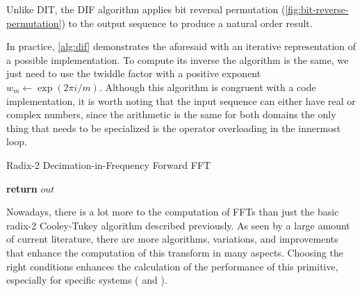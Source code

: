 \documentclass[
  oneside,
  11pt, a4paper,
  footinclude=true,
  headinclude=true,
  cleardoublepage=empty
]{scrbook}
\begin{document}

Unlike DIT, the DIF algorithm applies bit reversal permutation (\autoref{fig:bit-reverse-permutation}) to the output sequence to produce a natural order result.

In practice, \autoref{alg:dif} demonstrates the aforesaid with an iterative representation of a possible implementation. To compute its inverse the algorithm is the same, we just need to use the twiddle factor with a positive exponent $w_{m} \gets \exp(2\pi i / m)$.
Although this algorithm is congruent with a code implementation, it is worth noting that the input sequence can either have real or complex numbers, since the arithmetic is the same for both domains the only thing that needs to be specialized is the operator overloading in the innermost loop.

\begin{algorithm}[H]
    \caption{Radix-2 Decimation-in-Frequency Forward FFT} \label{alg:dif}

    

    \textbf{return} $out$\;
\end{algorithm}


Nowadays, there is a lot more to the computation of FFTs than just the basic radix-2 Cooley-Tukey algorithm described previously. As seen by a large amount of current literature, there are more algorithms, variations, and improvements that enhance the computation of this transform in many aspects. Choosing the right conditions enhances the calculation of the performance of this primitive, especially for specific systems (\cite{bengtsson2020development} and \cite{mermer2003efficient}). 
\end{document}
